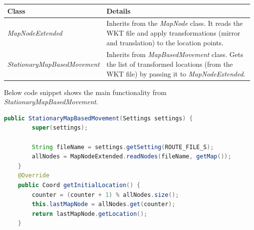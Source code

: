 	\begin{center}
	    \begin{tabular}{ | l | p{8.8cm} |}
    		\hline
    		\textbf{Class} & \textbf{Details} \\ \hline
    		\textit{MapNodeExtended} & Inherits from the \textit{MapNode} class. It reads the WKT file and apply transformations (mirror and translation) to the location points. \\ \hline
    		\textit{StationaryMapBasedMovement} & Inherits from \textit{MapBasedMovement} class. Gets the list of transformed locations (from the WKT file) by passing it to \textit{MapNodeExtended}. \\ \hline
    	\end{tabular}
    	 \label{tab:wktMapFiles}

	\end{center}
\newpage
Below code snippet shows the main functionality from \textit{StationaryMapBasedMovement}.
\vspace{3mm}
\begin{lstlisting}[language=java]
	public StationaryMapBasedMovement(Settings settings) {
		super(settings);

		String fileName = settings.getSetting(ROUTE_FILE_S);
		allNodes = MapNodeExtended.readNodes(fileName, getMap());
	}
	@Override
	public Coord getInitialLocation() {
		counter = (counter + 1) % allNodes.size();
		this.lastMapNode = allNodes.get(counter);
		return lastMapNode.getLocation();
	}
\end{lstlisting}
\label{lstlisting:node-positioning}

